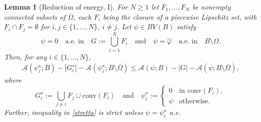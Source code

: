 \documentclass[JEP,XML,SOM,Unicode, NoFloatCountersInSection,published]{cedram}
\let\Om\Omega
\newtheorem{lemma}[theorem]{Lemma}
\theoremstyle{definition}
\begin{document}
\begin{lemma}[Reduction of energy, I]
\label{lem:reduction_of_energy_I}
For $N\ge1$ let $F_1,\dots,F_N$ be
nonempty connected subsets of $\overline \Om$,
each $F_i$ being the closure of a piecewise Lipschitz
set, with $F_i \cap F_j= \emptyset$ for $i,j \in \{1,\dots,
N\}$, $i\neq j$.
Let $\psi\in BV(B)$ satisfy
\begin{equation}\label{eq:psi_0_union}
\psi=0\quad\text{a.e. in}\quad G:=\bigcup_{i=1}^NF_i\quad\text{and}\quad
\psi=\widehat{\varphi}\quad\text{a.e. in}\quad B\setminus{\Om}.
\end{equation}
Then, for any $i\in\{1,\dots,N\}$,
\begin{align}\label{stretta}
\mathcal A(\psi_i^\star;B)-|G_i^\star|-\mathcal A(\psi_i^\star;B\setminus \overline\Omega)\leq
\mathcal A(\psi;B)-|G|-\mathcal A(\psi;B\setminus \overline\Omega),
\end{align}
where
\begin{equation}\label{def:E_star,Psi_star}
G_i^\star:=\bigcup_{j\neq i}F_j\cup \mathrm{conv}(F_i)\quad\text{and}\quad
\psi_i^\star :=\begin{cases}
0&\text{in } \mathrm{conv}(F_i),\\
\psi&\text{otherwise.}
\end{cases}
\end{equation} Further, inequality in \eqref{stretta} is strict unless $\psi=\psi^\star_i$ a.e.
\end{lemma}
\end{document}
